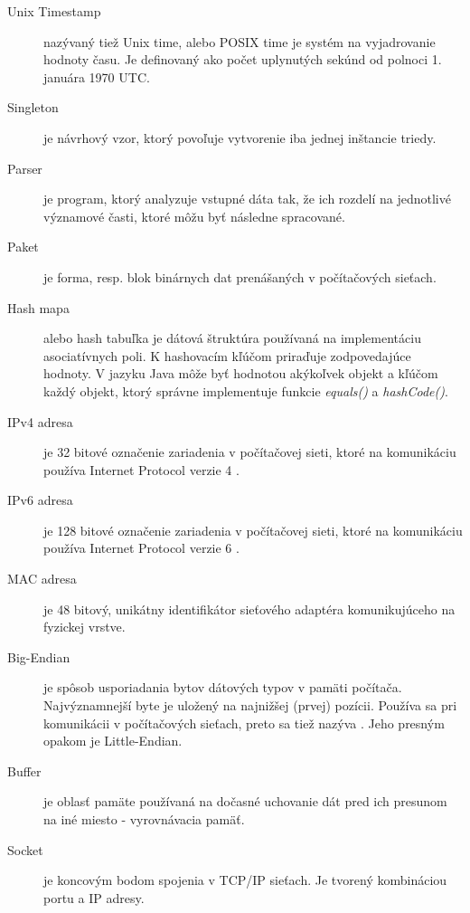 \documentclass[]{tukediphc}
\begin{document}
\begin{description}
	\item[Unix Timestamp] nazývaný tiež Unix time, alebo POSIX time je systém na vyjadrovanie 
	hodnoty času. Je definovaný ako počet uplynutých sekúnd od polnoci 1. januára 1970 UTC.
	
	\item[Singleton] je návrhový vzor, ktorý povoľuje vytvorenie iba jednej inštancie triedy. 
	
	\item[Parser] je program, ktorý analyzuje vstupné dáta tak, že ich rozdelí na jednotlivé 
	významové časti, ktoré môžu byť následne spracované. \citep{veri}
	
	\item[Paket] je forma, resp. blok binárnych dat prenášaných v počítačových sieťach.
	
	\item[Hash mapa] alebo hash tabuľka je dátová štruktúra používaná na implementáciu asociatívnych 
	poli. K hashovacím kľúčom priraďuje zodpovedajúce hodnoty. V jazyku Java môže byť hodnotou 
	akýkoľvek objekt a kľúčom každý objekt, ktorý správne implementuje funkcie \emph{equals()} a 
	\emph{hashCode()}.
	
	\item[IPv4 adresa] je 32 bitové označenie zariadenia v počítačovej sieti, ktoré na komunikáciu 
	používa Internet Protocol verzie 4 \citep{rfc791}.
	
	\item[IPv6 adresa] je 128 bitové označenie zariadenia v počítačovej sieti, ktoré na komunikáciu 
	používa Internet Protocol verzie 6 \citep{rfc2460}.
	
	\item[MAC adresa] je 48 bitový, unikátny identifikátor sieťového adaptéra komunikujúceho na 
	fyzickej vrstve. 
	
	\item[Big-Endian] je spôsob usporiadania bytov dátových typov v pamäti počítača. Najvýznamnejší 
	byte je uložený na najnižšej (prvej) pozícii. Používa sa pri komunikácii v počítačových sieťach,
	preto sa tiež nazýva . Jeho presným opakom je Little-Endian.
	
	\item[Buffer] je oblasť pamäte používaná na dočasné uchovanie dát pred ich presunom na iné 
	miesto - vyrovnávacia pamäť.
	
	\item[Socket] je koncovým bodom spojenia v TCP/IP sieťach. Je tvorený kombináciou portu a IP 
	adresy. \citep{linktionary} 
	
\end{description}
\end{document}

